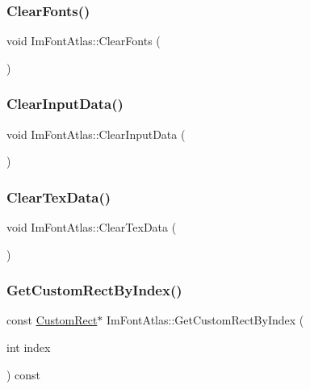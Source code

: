 \subsubsection{\texorpdfstring{Clear\+Fonts()}{ClearFonts()}}
{\footnotesize\ttfamily void Im\+Font\+Atlas\+::\+Clear\+Fonts (\begin{DoxyParamCaption}{ }\end{DoxyParamCaption})}

\mbox{\label{struct_im_font_atlas_a3f5bcbb7a2683b1af106fcf4e1217662}} 
\subsubsection{\texorpdfstring{Clear\+Input\+Data()}{ClearInputData()}}
{\footnotesize\ttfamily void Im\+Font\+Atlas\+::\+Clear\+Input\+Data (\begin{DoxyParamCaption}{ }\end{DoxyParamCaption})}

\mbox{\label{struct_im_font_atlas_a3ede4bd513bec044c77ac392ad9c6e86}} 
\subsubsection{\texorpdfstring{Clear\+Tex\+Data()}{ClearTexData()}}
{\footnotesize\ttfamily void Im\+Font\+Atlas\+::\+Clear\+Tex\+Data (\begin{DoxyParamCaption}{ }\end{DoxyParamCaption})}

\mbox{\label{struct_im_font_atlas_a4d4403e920f1d93307936781050b52ee}} 
\subsubsection{\texorpdfstring{Get\+Custom\+Rect\+By\+Index()}{GetCustomRectByIndex()}}
{\footnotesize\ttfamily const \mbox{\hyperlink{struct_im_font_atlas_1_1_custom_rect}{Custom\+Rect}}$\ast$ Im\+Font\+Atlas\+::\+Get\+Custom\+Rect\+By\+Index (\begin{DoxyParamCaption}\item[{int}]{index }\end{DoxyParamCaption}) const\hspace{0.3cm}{\ttfamily [inline]}}

